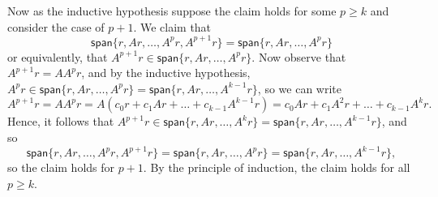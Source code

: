 \documentclass{../../../kin_math}
\begin{document}
\begin{questions}
\begin{solution}
    Now as the inductive hypothesis suppose the claim holds for some $p \geq k$ and consider the case of $p + 1$. We claim that
    \begin{equation*}
      \textsf{span}\{r, Ar, \dots, A^p r, A^{p + 1} r\} = \textsf{span}\{r, Ar, \dots, A^p r\}
    \end{equation*}
    or equivalently, that $A^{p + 1} r \in \textsf{span}\{r, Ar, \dots, A^p r\}$. Now observe that $A^{p + 1} r = A A^p r$, and by the inductive hypothesis, $A^p r \in \textsf{span}\{r, Ar, \dots, A^p r\} = \textsf{span}\{r, Ar, \dots, A^{k - 1} r\}$, so we can write
    \begin{equation*}
      A^{p + 1} r = A A^p r = A (c_0 r + c_1 A r + \dots + c_{k - 1} A^{k - 1} r) = c_0 A r + c_1 A^2 r + \dots + c_{k - 1} A^k r.
    \end{equation*}
    Hence, it follows that $A^{p + 1} r \in \textsf{span}\{r, Ar, \dots, A^k r\} = \textsf{span}\{r, Ar, \dots, A^{k - 1} r\}$, and so
    \begin{equation*}
      \textsf{span}\{r, Ar, \dots, A^p r, A^{p + 1} r\} = \textsf{span}\{r, Ar, \dots, A^p r\} = \textsf{span}\{r, Ar, \dots, A^{k - 1} r\},
    \end{equation*}
    so the claim holds for $p + 1$. By the principle of induction, the claim holds for all $p \geq k$.
  \end{solution}


\end{questions}
\end{document}

